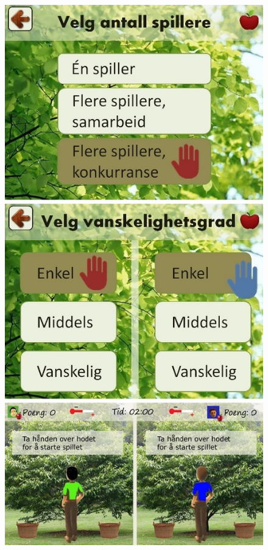 \begin{figure} [H]
\centering
\includegraphics[scale=0.45]{menuStep4.jpg}
\label{app:menu4Norsk}
\end{figure}

